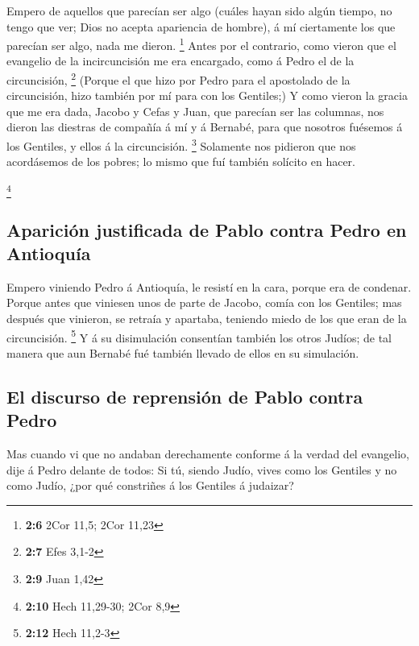  Empero de aquellos que parecían ser algo (cuáles hayan
sido algún tiempo, no tengo que ver; Dios no acepta apariencia de
hombre), á mí ciertamente los que parecían ser algo, nada me dieron.
\footnote{\textbf{2:6} 2Cor 11,5; 2Cor 11,23}  Antes por
el contrario, como vieron que el evangelio de la incircuncisión me era
encargado, como á Pedro el de la circuncisión, \footnote{\textbf{2:7}
  Efes 3,1-2}  (Porque el que hizo por Pedro para el
apostolado de la circuncisión, hizo también por mí para con los
Gentiles;)  Y como vieron la gracia que me era dada,
Jacobo y Cefas y Juan, que parecían ser las columnas, nos dieron las
diestras de compañía á mí y á Bernabé, para que nosotros fuésemos á los
Gentiles, y ellos á la circuncisión. \footnote{\textbf{2:9} Juan 1,42}
 Solamente nos pidieron que nos acordásemos de los
pobres; lo mismo que fuí también solícito en hacer.

\footnote{\textbf{2:10} Hech 11,29-30; 2Cor 8,9}

\hypertarget{apariciuxf3n-justificada-de-pablo-contra-pedro-en-antioquuxeda}{%
\subsection{Aparición justificada de Pablo contra Pedro en
Antioquía}\label{apariciuxf3n-justificada-de-pablo-contra-pedro-en-antioquuxeda}}

 Empero viniendo Pedro á Antioquía, le resistí en la
cara, porque era de condenar.  Porque antes que viniesen
unos de parte de Jacobo, comía con los Gentiles; mas después que
vinieron, se retraía y apartaba, teniendo miedo de los que eran de la
circuncisión. \footnote{\textbf{2:12} Hech 11,2-3}  Y á
su disimulación consentían también los otros Judíos; de tal manera que
aun Bernabé fué también llevado de ellos en su simulación.

\hypertarget{el-discurso-de-reprensiuxf3n-de-pablo-contra-pedro}{%
\subsection{El discurso de reprensión de Pablo contra
Pedro}\label{el-discurso-de-reprensiuxf3n-de-pablo-contra-pedro}}

 Mas cuando vi que no andaban derechamente conforme á la
verdad del evangelio, dije á Pedro delante de todos: Si tú, siendo
Judío, vives como los Gentiles y no como Judío, ¿por qué constriñes á
los Gentiles á judaizar?


